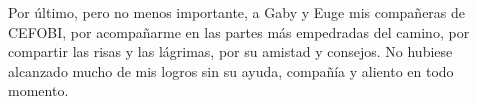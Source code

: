 Por último, pero no menos importante, a Gaby y Euge mis compañeras de CEFOBI, por acompañarme en las partes más empedradas del camino, por compartir las risas y las  lágrimas, por su amistad y consejos. No hubiese alcanzado mucho de mis logros sin su ayuda, compañía y aliento en todo momento.




